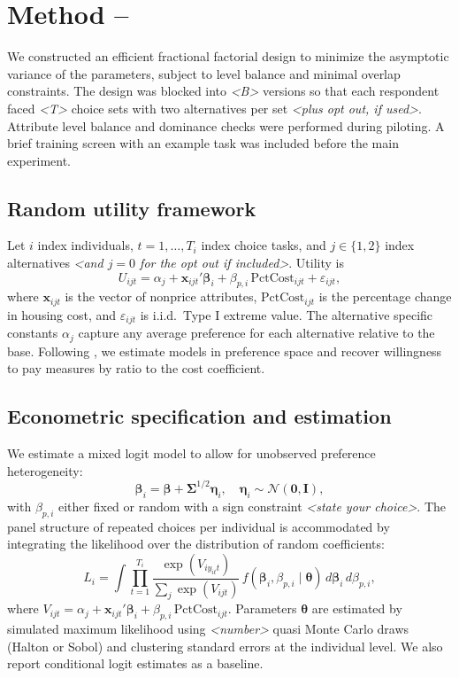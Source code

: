\documentclass[3p,12pt ]{elsarticle}
\begin{document}
\section{Method -- }

We constructed an efficient fractional factorial design to minimize the asymptotic variance of the parameters, subject to level balance and minimal overlap constraints. The design was blocked into \textit{<B>} versions so that each respondent faced \textit{<T>} choice sets with two alternatives per set \textit{<plus opt out, if used>}. Attribute level balance and dominance checks were performed during piloting. A brief training screen with an example task was included before the main experiment.

\subsection{Random utility framework}
Let $i$ index individuals, $t = 1,\dots,T_i$ index choice tasks, and $j \in \{1,2\}$ index alternatives \textit{<and $j=0$ for the opt out if included>}. Utility is
\begin{equation}
U_{ijt} = \alpha_j + \mathbf{x}_{ijt}' \boldsymbol{\beta}_i + \beta_{p,i} \, \text{PctCost}_{ijt} + \varepsilon_{ijt},
\end{equation}
where $\mathbf{x}_{ijt}$ is the vector of nonprice attributes, $\text{PctCost}_{ijt}$ is the percentage change in housing cost, and $\varepsilon_{ijt}$ is i.i.d.\ Type I extreme value. The alternative specific constants $\alpha_j$ capture any average preference for each alternative relative to the base. Following \citet{Caplan2021}, we estimate models in preference space and recover willingness to pay measures by ratio to the cost coefficient.

\subsection{Econometric specification and estimation}
We estimate a mixed logit model to allow for unobserved preference heterogeneity:
\begin{equation}
\boldsymbol{\beta}_i = \boldsymbol{\beta} + \mathbf{\Sigma}^{1/2} \mathbf{\eta}_i, \quad \mathbf{\eta}_i \sim \mathcal{N}(\mathbf{0}, \mathbf{I}),
\end{equation}
with $\beta_{p,i}$ either fixed or random with a sign constraint \textit{<state your choice>}. The panel structure of repeated choices per individual is accommodated by integrating the likelihood over the distribution of random coefficients:
\begin{equation}
L_i = \int \prod_{t=1}^{T_i} \frac{\exp\left( V_{i y_{it} t} \right)}{\sum_{j} \exp\left( V_{ijt} \right)} \, f(\boldsymbol{\beta}_i, \beta_{p,i} \mid \boldsymbol{\theta}) \, d\boldsymbol{\beta}_i \, d\beta_{p,i},
\end{equation}
where $V_{ijt} = \alpha_j + \mathbf{x}_{ijt}' \boldsymbol{\beta}_i + \beta_{p,i} \, \text{PctCost}_{ijt}$. Parameters $\boldsymbol{\theta}$ are estimated by simulated maximum likelihood using \textit{<number>} quasi Monte Carlo draws (Halton or Sobol) and clustering standard errors at the individual level. We also report conditional logit estimates as a baseline.
\end{document}
